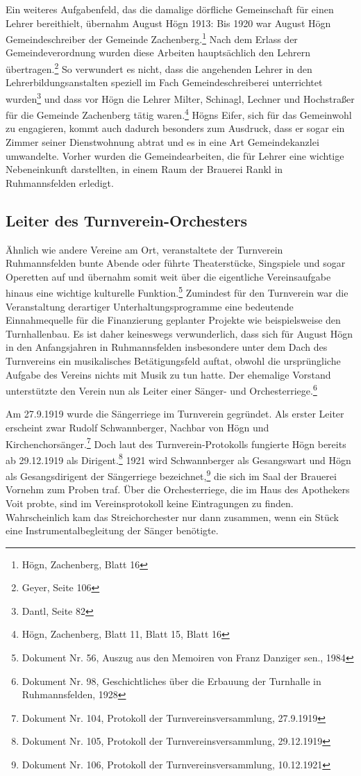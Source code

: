 \documentclass[a4paper]{article}
\newcommand\textstyleFootnoteSymbol[1]{\textsuperscript{#1}}
\begin{document}
Ein weiteres Aufgabenfeld, das die damalige dörfliche Gemeinschaft für
einen Lehrer bereithielt, übernahm August Högn 1913: Bis 1920 war
August Högn Gemeindeschreiber der Gemeinde Zachenberg.\footnote{ Högn,
Zachenberg, Blatt 16} Nach dem Erlass der Gemeindeverordnung wurden
diese Arbeiten hauptsächlich den Lehrern übertragen.\footnote{ Geyer,
Seite 106} So verwundert es nicht, dass die angehenden Lehrer in den
Lehrerbildungsanstalten speziell im Fach Gemeindeschreiberei
unterrichtet wurden\footnote{ Dantl, Seite 82} und dass vor Högn die
Lehrer Milter, Schinagl, Lechner und Hochstraßer für die Gemeinde
Zachenberg tätig waren.\footnote{ Högn, Zachenberg, Blatt 11, Blatt 15,
Blatt 16} Högns Eifer, sich für das Gemeinwohl zu engagieren, kommt
auch dadurch besonders zum Ausdruck, dass er sogar ein Zimmer seiner
Dienstwohnung abtrat und es in eine Art Gemeindekanzlei
umwandelte.\textstyleFootnoteSymbol{ }Vorher wurden die
Gemeindearbeiten, die für Lehrer eine wichtige Nebeneinkunft
darstellten, in einem Raum der Brauerei Rankl in Ruhmannsfelden
erledigt.

\subsection{Leiter des Turnverein-Orchesters}
\hypertarget{RefHeadingToc100333730}{}Ähnlich wie andere Vereine am Ort,
veranstaltete der Turnverein Ruhmannsfelden bunte Abende oder führte
Theaterstücke, Singspiele und sogar Operetten auf und übernahm somit
weit über die eigentliche Vereinsaufgabe hinaus eine wichtige
kulturelle Funktion.\footnote{ Dokument Nr. 56, Auszug aus den Memoiren
von Franz Danziger sen., 1984} Zumindest für den Turnverein war die
Veranstaltung derartiger Unterhaltungsprogramme eine bedeutende
Einnahmequelle für die Finanzierung geplanter Projekte wie
beispielsweise den Turnhallenbau. Es ist daher keineswegs
verwunderlich, dass sich für August Högn in den Anfangsjahren in
Ruhmannsfelden insbesondere unter dem Dach des Turnvereins ein
musikalisches Betätigungsfeld auftat, obwohl die ursprüngliche Aufgabe
des Vereins nichts mit Musik zu tun hatte. Der ehemalige Vorstand
unterstützte den Verein nun als Leiter einer Sänger- und
Orchesterriege.\footnote{ Dokument Nr. 98, Geschichtliches über die
Erbauung der Turnhalle in Ruhmannsfelden, 1928} 

Am 27.9.1919 wurde die Sängerriege im Turnverein gegründet. Als erster
Leiter erscheint zwar Rudolf Schwannberger, Nachbar von Högn und
Kirchenchorsänger.\footnote{ Dokument Nr. 104, Protokoll der
Turnvereinsversammlung, 27.9.1919} Doch laut des Turnverein-Protokolls
fungierte Högn bereits ab 29.12.1919 als Dirigent.\footnote{ Dokument
Nr. 105, Protokoll der Turnvereinsversammlung, 29.12.1919} 1921 wird
Schwannberger als Gesangswart und Högn als Gesangsdirigent der
Sängerriege bezeichnet,\footnote{ Dokument Nr. 106, Protokoll der
Turnvereinsversammlung, 10.12.1921} die sich im Saal der Brauerei
Vornehm zum Proben traf. Über die Orchesterriege, die im Haus des
Apothekers Voit probte, sind im Vereinsprotokoll keine Eintragungen zu
finden. Wahrscheinlich kam das Streichorchester nur dann zusammen, wenn
ein Stück eine Instrumentalbegleitung der Sänger benötigte.
\end{document}
